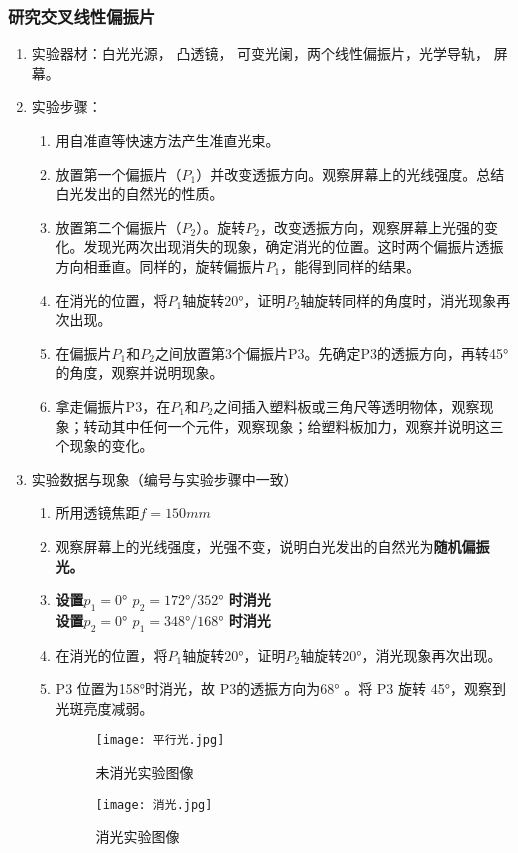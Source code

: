 \documentclass[dvipsnames, svgnames,a4paper,11pt]{article}
\begin{document}
	\subsubsection{研究交叉线性偏振片}
	\begin{enumerate}
	\item 实验器材：白光光源， 凸透镜， 可变光阑，两个线性偏振片，光学导轨， 屏幕。
	\item 实验步骤：
	\begin{enumerate}
		\item 用自准直等快速方法产生准直光束。
		\item 放置第一个偏振片（$P_1$）并改变透振方向。观察屏幕上的光线强度。总结白光发出的自然光的性质。
    
    \item 放置第二个偏振片（$P_2$）。旋转$P_2$，改变透振方向，观察屏幕上光强的变化。发现光两次出现消失的现象，确定消光的位置。这时两个偏振片透振方向相垂直。同样的，旋转偏振片$P_1$，能得到同样的结果。
    
    \item 在消光的位置，将$P_1$轴旋转20°，证明$P_2$轴旋转同样的角度时，消光现象再次出现。
    
    \item 在偏振片$P_1$和$P_2$之间放置第3个偏振片P3。先确定P3的透振方向，再转45°的角度，观察并说明现象。
    
    \item 拿走偏振片P3，在$P_1$和$P_2$之间插入塑料板或三角尺等透明物体，观察现象；转动其中任何一个元件，观察现象；给塑料板加力，观察并说明这三个现象的变化。
	\end{enumerate}	
	\item 实验数据与现象（编号与实验步骤中一致）
	 \begin{enumerate}
		\item 所用透镜焦距$f =150 mm$
		\item 观察屏幕上的光线强度，光强不变，说明白光发出的自然光为\textbf{随机偏振光。}
		\item \textbf{设置$p_1=0°$ \quad $p_2=  172 °/352°$ 时消光\\
		设置$p_2=0°$ \quad$p_1=  348°/168 °$ 时消光}
		\item 在消光的位置，将$P_1$轴旋转20°，证明$P_2$轴旋转20°，消光现象再次出现。
		\item P3 位置为158°时消光，故 P3的透振方向为68° 。将 P3 旋转 45°，观察到光斑亮度减弱。
		\begin{figure}[H]
			\centering
			\begin{minipage}[b]{0.4\linewidth}
				\centering
				\texttt{[image: 平行光.jpg]}
				\caption{未消光实验图像}
			\end{minipage}
			\hfill
			\begin{minipage}[b]{0.4\linewidth}
				\centering
				\texttt{[image: 消光.jpg]}
				\caption{消光实验图像}
			\end{minipage}
		\end{figure}
		
		
	\end{enumerate}
	
\end{enumerate}	
\end{document}
